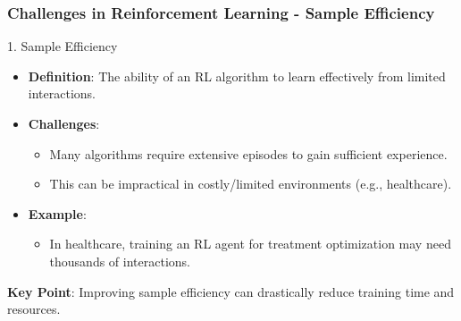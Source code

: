 \documentclass[aspectratio=169]{beamer}
\begin{document}
\begin{frame}[fragile]
    \frametitle{Challenges in Reinforcement Learning - Sample Efficiency}
    \begin{block}{1. Sample Efficiency}
        \begin{itemize}
            \item \textbf{Definition}: The ability of an RL algorithm to learn effectively from limited interactions.
            \item \textbf{Challenges}:
            \begin{itemize}
                \item Many algorithms require extensive episodes to gain sufficient experience.
                \item This can be impractical in costly/limited environments (e.g., healthcare).
            \end{itemize}
            \item \textbf{Example}: 
            \begin{itemize}
                \item In healthcare, training an RL agent for treatment optimization may need thousands of interactions.
            \end{itemize}
        \end{itemize}
        \textbf{Key Point}: Improving sample efficiency can drastically reduce training time and resources.
    \end{block}
\end{frame}
\end{document}
